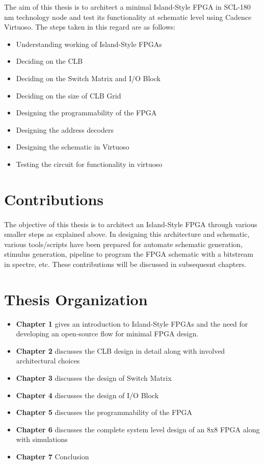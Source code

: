The aim of this thesis is to architect a minimal Island-Style FPGA in SCL-180 nm technology node and test its functionality at schematic level using Cadence Virtuoso. The steps taken in this regard are as follows:
\begin{itemize}
  \item Understanding working of Island-Style FPGAs
  \item Deciding on the CLB
  \item Deciding on the Switch Matrix and I/O Block
  \item Deciding on the size of CLB Grid
  \item Designing the programmability of the FPGA
  \item Designing the address decoders
  \item Designing the schematic in Virtuoso
  \item Testing the circuit for functionality in virtuoso
\end{itemize}

\section{Contributions}
\paragraph{}
The objective of this thesis is to architect an Island-Style FPGA through various smaller steps as explained above. In designing this architecture and schematic, various tools/scripts have been prepared for automate schematic generation, stimulus generation, pipeline to program the FPGA schematic with a bitstream in spectre, etc. These contributions will be discussed in subsequesnt chapters.

\section{Thesis Organization}

\begin{itemize}
  \item \textbf{Chapter 1} gives an introduction to Island-Style FPGAs and the need for developing an open-source flow for minimal FPGA design.

  \item \textbf{Chapter 2} discusses the CLB design in detail along with involved architectural choices

  \item \textbf{Chapter 3} discusses the design of Switch Matrix 

  \item \textbf{Chapter 4} discusses the design of I/O Block

  \item \textbf{Chapter 5} discusses the programmability of the FPGA

  \item \textbf{Chapter 6} discusses the complete system level design of an 8x8 FPGA along with simulations

  \item \textbf{Chapter 7} Conclusion
\end{itemize}

